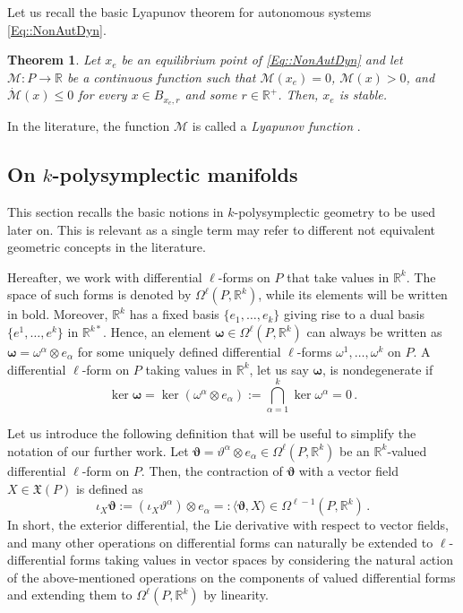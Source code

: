 \documentclass[11pt]{article}
\theoremstyle{plain}
\newtheorem{theorem}{Theorem}[section]
\theoremstyle{definition}
\newcommand{\R}{\mathbb{R}}
\newcommand{\bomega}{{\boldsymbol{\omega}}}
\numberwithin{equation}{section}
\begin{document}
Let us recall the basic Lyapunov theorem for autonomous systems \eqref{Eq::NonAutDyn}.

\begin{theorem}
\label{Th::LyapunovStabilityTheory}
Let $x_e$ be an equilibrium point of \eqref{Eq::NonAutDyn} and let $\mathcal{M}:P\rightarrow \mathbb{R}$ be a continuous function such that $\mathcal{M}(x_e)=0$, $\mathcal{M}(x)>0$, and $\dot{\mathcal{M}}(x)\leq 0$ for every $x\in B_{x_e,r}$ and some $r\in \mathbb{R}^+$. Then, $x_e$ is stable.
\end{theorem}
In the literature, the function $\mathcal{M}$ is called a {\it Lyapunov function} \cite{Vid_02}.

\subsection{On \texorpdfstring{$k$}{}-polysymplectic manifolds}\label{Sec::moment-maps}


This section recalls the basic notions in $k$-polysymplectic geometry to be used later on. This is relevant as a single term may refer to different not equivalent geometric concepts in the literature. 

Hereafter, we work with differential $\ell$-forms on $P$ that take values in $\R^k$. The space of such forms is denoted by $\Omega^\ell(P,\R^k)$, while its elements will be written in bold. Moreover, $\R^k$ has a fixed basis $\{e_1,\ldots,e_k\}$ giving rise to a dual basis $\{e^1,\ldots, e^k\}$ in $\R^{k*}$. Hence, an element $\bomega\in\Omega^\ell(P,\R^k)$ can always be written as $\bomega = \omega^\alpha\otimes e_\alpha$ for some uniquely defined differential $\ell$-forms $\omega^1,\ldots,\omega^k$ on $P$. A differential $\ell$-form on $P$ taking values in $\mathbb{R}^k$, let us say $\bomega$, is nondegenerate if  
$$ 
\ker \boldsymbol{\omega}=\ker (\omega^\alpha\otimes e_\alpha):=\bigcap_{\alpha = 1}^k \ker\omega^\alpha = 0\,. 
$$

Let us introduce the following definition that will be useful to simplify the notation of our further work. Let $\bm\vartheta = \vartheta^\alpha\otimes e_\alpha\in\Omega^\ell(P,\R^k)$ be an $\R^k$-valued differential $\ell$-form on $P$. Then, the contraction of $\bm \vartheta$ with a vector field $X\in\mathfrak{X}(P)$ is defined as
\[
\iota_X \bm\vartheta := (\iota_X\vartheta^\alpha)\otimes e_\alpha=:\langle \bm\vartheta,X\rangle\in\Omega^{\ell-1}(P,\R^k)\,.
\]
In short, the exterior differential, the Lie derivative with respect to vector fields, and many other operations on differential forms can naturally be extended to $\ell$-differential forms taking values in vector spaces by considering the natural action of the above-mentioned operations on the components of valued differential forms and extending them to $\Omega^{\ell}(P,\mathbb{R}^k)$ by linearity.
\end{document}
